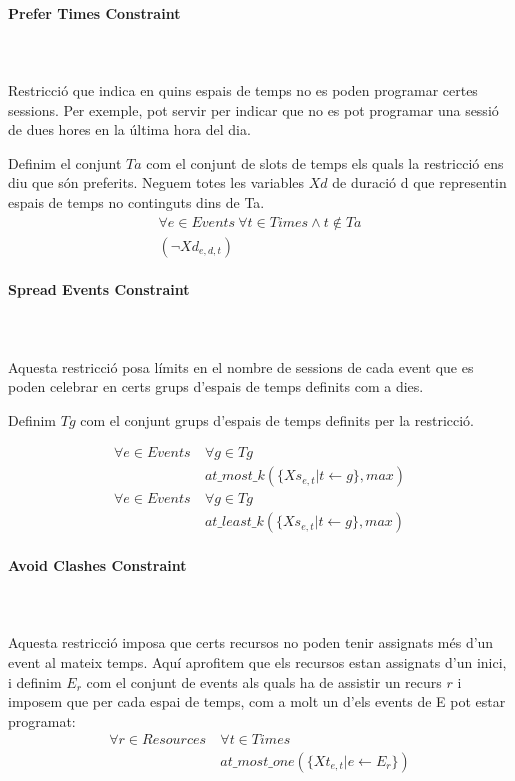 \documentclass[11pt,a4paper,twoside]{report}
\begin{document}
  \paragraph*{Prefer Times Constraint} ~\\~\\
  
  Restricció que indica en quins espais de temps no es poden programar certes sessions. Per exemple, pot servir per indicar que no es pot programar una sessió de dues hores en la última hora del dia.

  Definim el conjunt $Ta$ com el conjunt de slots de temps els quals la restricció ens diu que són preferits. Neguem totes les variables $Xd$ de duració d que representin espais de temps no continguts dins de Ta.
  \begin{gather*}
    \forall e \in Events \ \forall t \in Times \land t \notin Ta \\ (\neg Xd_{e,d,t})
  \end{gather*}


  \paragraph*{Spread Events Constraint} ~\\~\\
  
  Aquesta restricció posa límits en el nombre de sessions de cada event que es poden celebrar en certs grups d'espais de temps definits com a dies.

  Definim $Tg$ com el conjunt grups d'espais de temps definits per la restricció.

    \begin{align*}
      \forall e \in Events \ &\forall g \in Tg \\
      &at\_most\_k(\{Xs_{e,t} | t \leftarrow g\}, max)\\
      \forall e \in Events \ &\forall g \in Tg \\
      &at\_least\_k(\{Xs_{e,t} | t \leftarrow g\}, max)
    \end{align*}


  \paragraph*{Avoid Clashes Constraint} ~\\~\\

    Aquesta restricció imposa que certs recursos no poden tenir assignats més d'un event al mateix temps. 
    Aquí aprofitem que els recursos estan assignats d'un inici, i definim $E_r$ com el conjunt de events als quals ha de assistir un recurs $r$ i imposem que per cada espai de temps, com a molt un d'els events de E pot estar programat:
    \begin{align*}
      \forall r \in Resources \ & \forall t \in Times \\
      &at\_most\_one(\{Xt_{e,t} | e \leftarrow E_r\})
    \end{align*}
\end{document}
